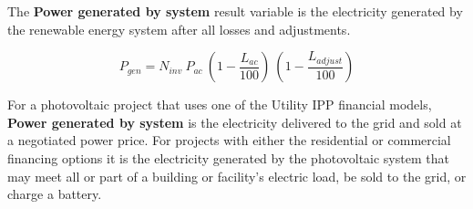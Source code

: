 \documentclass[12pt,letterpaper]{article}
\begin{document}
The \textbf{Power generated by system} result variable is the electricity generated by the renewable energy system after all losses and adjustments. 

\begin{equation}
P_{gen}=  N_{inv}~P_{ac}~\left(1-\frac{L_{ac}}{100}\right)~\left(1-\frac{L_{\textit{adjust}}}{100}\right)
\end{equation}


For a photovoltaic project that uses one of the Utility IPP financial models, \textbf{Power generated by system} is the electricity delivered to the grid and sold at a negotiated power price. For projects with either the residential or commercial financing options it is the electricity generated by the photovoltaic system that may meet all or part of a building or facility's electric load, be sold to the grid, or charge a battery.



\cleardoublepage

\label{sec:Bib}
%
\end{document}
